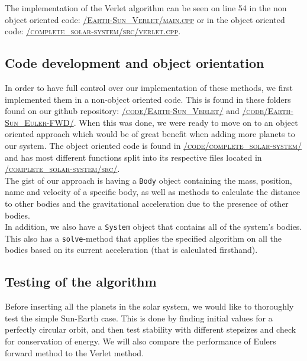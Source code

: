 \documentclass[../main.tex]{subfiles}
\begin{document}
The implementation of the Verlet algorithm can be seen on line 54 in the non object oriented code: \href{https://github.com/kmaasrud/Project-5/blob/master/code/Earth-Sun_Verlet/main.cpp}{\textsc{/Earth-Sun\_Verlet/main.cpp}} or in the object oriented code: \href{https://github.com/kmaasrud/Project-5/blob/master/code/complete_solar-system/src/verlet.cpp}{\textsc{/complete\_solar-system/src/verlet.cpp}}.


\subsection{Code development and object orientation}
In order to have full control over our implementation of these methods, we first implemented them in a non-object oriented code. This is found in these folders found on our github repository\cite{repository}: \href{https://github.com/kmaasrud/Project-5/blob/master/code/Earth-Sun_Verlet/}{\textsc{/code/Earth-Sun\_Verlet/}} and \href{https://github.com/kmaasrud/Project-5/blob/master/code/Earth-Sun_Euler-FWD/}{\textsc{/code/Earth-Sun\_Euler-FWD/}}. When this was done, we were ready to move on to an object oriented approach which would be of great benefit when adding more planets to our system.
The object oriented code is found in \href{https://github.com/kmaasrud/Project-5/blob/master/code/complete_solar-system/}{\textsc{/code/complete\_solar-system/}} and has most different functions split into its respective files located in \href{https://github.com/kmaasrud/Project-5/blob/master/code/complete_solar-system/src/}{\textsc{/complete\_solar-system/src/}}. \\
The gist of our approach is having a \verb+Body+ object containing the mass, position, name and velocity of a specific body, as well as methods to calculate the distance to other bodies and the gravitational acceleration due to the presence of other bodies. \\
In addition, we also have a \verb+System+ object that contains all of the system's bodies. This also has a \verb+solve+-method that applies the specified algorithm on all the bodies based on its current acceleration (that is calculated firsthand). \\


\subsection{Testing of the algorithm}
Before inserting all the planets in the solar system, we would like to thoroughly test the simple Sun-Earth case. This is done by finding initial values for a perfectly circular orbit, and then test stability with different stepsizes and check for conservation of energy. We will also compare the performance of Eulers forward method to the Verlet method.
\end{document}
